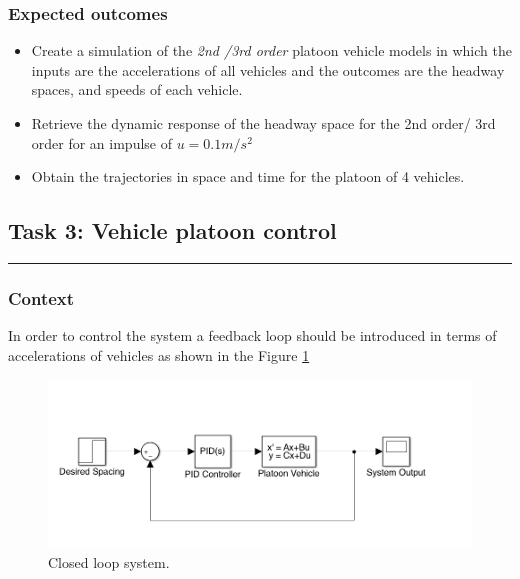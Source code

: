 \documentclass[]{book}
\providecommand{\tightlist}{%
  \setlength{\itemsep}{0pt}\setlength{\parskip}{0pt}}
\theoremstyle{definition}
\theoremstyle{definition}
\theoremstyle{definition}
\theoremstyle{remark}
\begin{document}
\hypertarget{expected-outcomes-5}{%
\subsubsection*{Expected outcomes}\label{expected-outcomes-5}}

\begin{itemize}
\tightlist
\item
  Create a simulation of the \emph{2nd /3rd order} platoon vehicle
  models in which the inputs are the accelerations of all vehicles and
  the outcomes are the headway spaces, and speeds of each vehicle.
\item
  Retrieve the dynamic response of the headway space for the 2nd order/
  3rd order for an impulse of \(u = 0.1m/s^2\)
\item
  Obtain the trajectories in space and time for the platoon of 4
  vehicles.
\end{itemize}

\hypertarget{task-3-vehicle-platoon-control}{%
\subsection*{Task 3: Vehicle platoon
control}\label{task-3-vehicle-platoon-control}}

\begin{center}\rule{0.5\linewidth}{\linethickness}\end{center}

\hypertarget{context-7}{%
\subsubsection*{Context}\label{context-7}}

In order to control the system a feedback loop should be introduced in
terms of accelerations of vehicles as shown in the Figure
\ref{fig:closedcav}



\begin{figure}

{\centering \includegraphics{images/p2-03-closed-loop} 

}

\caption{Closed loop system.}\label{fig:closedcav}
\end{figure}
\end{document}
